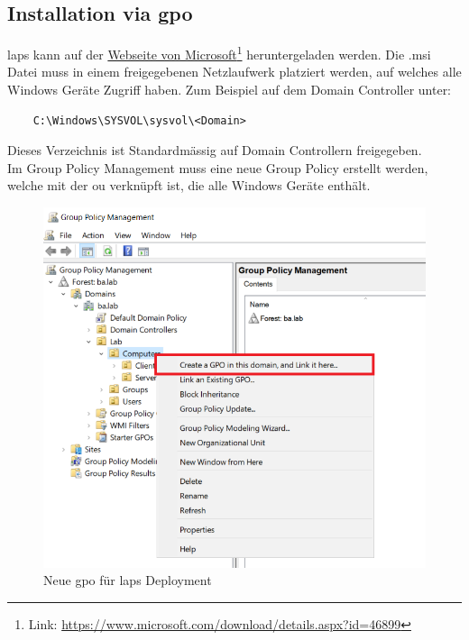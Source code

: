 \subsection{Installation via \acrshort{gpo}}
\acrshort{laps} kann auf der \href{https://www.microsoft.com/download/details.aspx?id=46899}{Webseite von Microsoft}\footnote{Link: \href{https://www.microsoft.com/download/details.aspx?id=46899}{https://www.microsoft.com/download/details.aspx?id=46899}} heruntergeladen werden.
Die .msi Datei muss in einem freigegebenen Netzlaufwerk platziert werden, auf welches alle Windows Geräte Zugriff haben.
Zum Beispiel auf dem Domain Controller unter:
\begin{lstlisting}
    C:\Windows\SYSVOL\sysvol\<Domain>
\end{lstlisting}
Dieses Verzeichnis ist Standardmässig auf Domain Controllern freigegeben.\\

Im Group Policy Management muss eine neue Group Policy erstellt werden, welche mit der \acrshort{ou} verknüpft ist, die alle Windows Geräte enthält.
\begin{figure}[H]
    \centering
    \includegraphics[width=\linewidth]{../img/LAPS/GPO-Create-New.png}
    \caption{Neue \acrshort{gpo} für \acrshort{laps} Deployment}
\end{figure}

